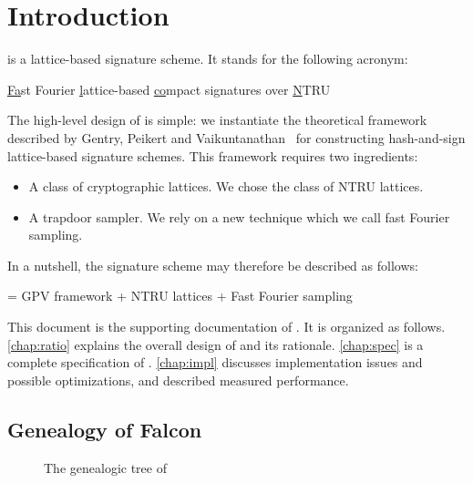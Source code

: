 
\chapter{Introduction}

\falcon{} is a lattice-based signature scheme. It stands for the following acronym:
\begin{center}
\underline{Fa}st Fourier \underline{l}attice-based \underline{co}mpact signatures over \underline{N}TRU
\end{center}

The high-level design of \falcon is simple: we instantiate the theoretical framework described by Gentry, Peikert and Vaikuntanathan~\cite{STOC:GenPeiVai08} for constructing hash-and-sign lattice-based signature schemes. This framework requires two ingredients:
\begin{itemize}
 \item A class of cryptographic lattices. We chose the class of NTRU lattices.
 \item A trapdoor sampler. We rely on a new technique which we call fast Fourier sampling.
\end{itemize}
In a nutshell, the \falcon signature scheme may therefore be described as follows:
\begin{center}
\falcon = GPV framework + NTRU lattices + Fast Fourier sampling
\end{center}

This document is the supporting documentation of \falcon. It is organized as follows. \cref{chap:ratio} explains the overall design of \falcon and its rationale. \cref{chap:spec} is a complete specification of \falcon. \cref{chap:impl} discusses implementation issues and possible optimizations, and described measured performance.

\newpage

\section{Genealogy of Falcon}

\begin{figure}[H]
\centering
{}
\caption{The genealogic tree of \falcon}\label{fig:genealogictree}
\end{figure}

